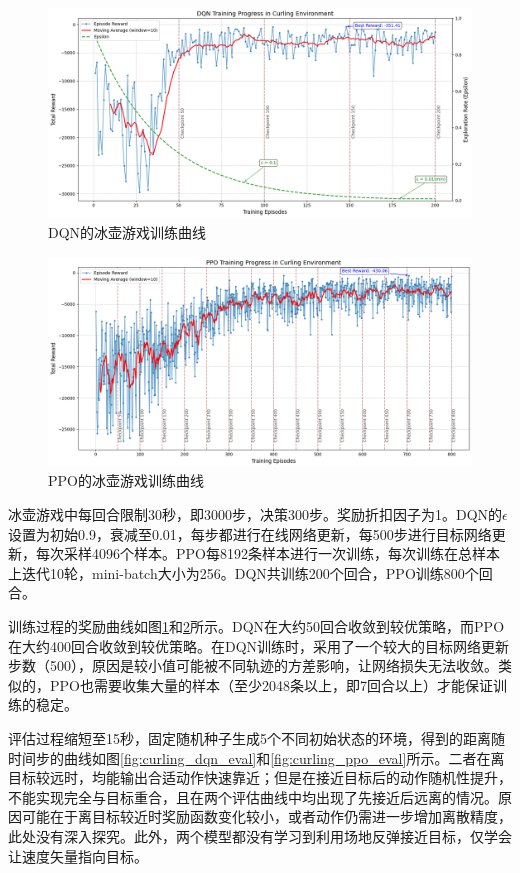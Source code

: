 \documentclass[12pt,a4paper]{article}
\begin{document}
\begin{figure}[htbp!]
    \centering
    \includegraphics[width=1\textwidth]{images/curling_dqn_train.png}
    \caption{DQN的冰壶游戏训练曲线}
    \label{fig:curling_dqn_train}
\end{figure}
\begin{figure}[htbp!]
    \centering
    \includegraphics[width=1\textwidth]{images/curling_ppo_train.png}
    \caption{PPO的冰壶游戏训练曲线}
    \label{fig:curling_ppo_train}
\end{figure}

冰壶游戏中每回合限制30秒，即3000步，决策300步。奖励折扣因子为1。DQN的$\epsilon$设置为初始0.9，衰减至0.01，每步都进行在线网络更新，每500步进行目标网络更新，每次采样4096个样本。PPO每8192条样本进行一次训练，每次训练在总样本上迭代10轮，mini-batch大小为256。DQN共训练200个回合，PPO训练800个回合。

训练过程的奖励曲线如图\ref{fig:curling_dqn_train}和\ref{fig:curling_ppo_train}所示。DQN在大约50回合收敛到较优策略，而PPO在大约400回合收敛到较优策略。在DQN训练时，采用了一个较大的目标网络更新步数（500），原因是较小值可能被不同轨迹的方差影响，让网络损失无法收敛。类似的，PPO也需要收集大量的样本（至少2048条以上，即7回合以上）才能保证训练的稳定。

评估过程缩短至15秒，固定随机种子生成5个不同初始状态的环境，得到的距离随时间步的曲线如图\ref{fig:curling_dqn_eval}和\ref{fig:curling_ppo_eval}所示。二者在离目标较远时，均能输出合适动作快速靠近；但是在接近目标后的动作随机性提升，不能实现完全与目标重合，且在两个评估曲线中均出现了先接近后远离的情况。原因可能在于离目标较近时奖励函数变化较小，或者动作仍需进一步增加离散精度，此处没有深入探究。此外，两个模型都没有学习到利用场地反弹接近目标，仅学会让速度矢量指向目标。
\end{document}
